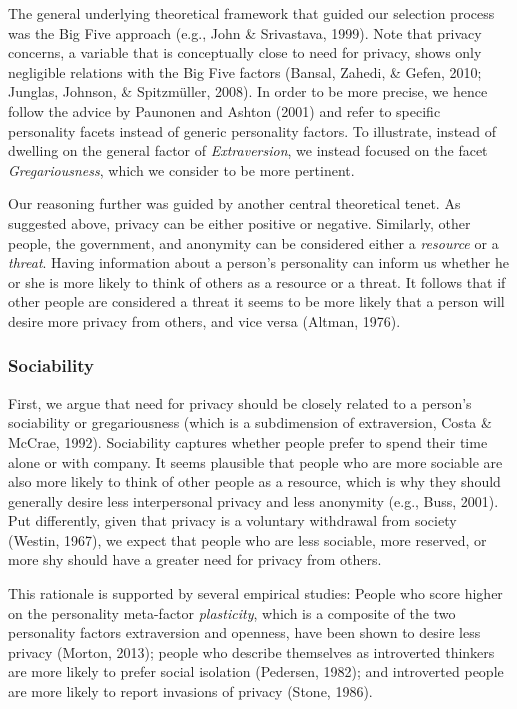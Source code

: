 \documentclass[man,floatsintext]{apa6}
\begin{document}
The general underlying theoretical framework that guided our selection process was the Big Five approach (e.g., John \& Srivastava, 1999). Note that privacy concerns, a variable that is conceptually close to need for privacy, shows only negligible relations with the Big Five factors (Bansal, Zahedi, \& Gefen, 2010; Junglas, Johnson, \& Spitzmüller, 2008). In order to be more precise, we hence follow the advice by Paunonen and Ashton (2001) and refer to specific personality facets instead of generic personality factors. To illustrate, instead of dwelling on the general factor of \emph{Extraversion}, we instead focused on the facet \emph{Gregariousness}, which we consider to be more pertinent.

Our reasoning further was guided by another central theoretical tenet. As suggested above, privacy can be either positive or negative. Similarly, other people, the government, and anonymity can be considered either a \emph{resource} or a \emph{threat}. Having information about a person's personality can inform us whether he or she is more likely to think of others as a resource or a threat. It follows that if other people are considered a threat it seems to be more likely that a person will desire more privacy from others, and vice versa (Altman, 1976).

\hypertarget{sociability}{%
\subsubsection{Sociability}\label{sociability}}

First, we argue that need for privacy should be closely related to a person's sociability or gregariousness (which is a subdimension of extraversion, Costa \& McCrae, 1992). Sociability captures whether people prefer to spend their time alone or with company. It seems plausible that people who are more sociable are also more likely to think of other people as a resource, which is why they should generally desire less interpersonal privacy and less anonymity (e.g., Buss, 2001). Put differently, given that privacy is a voluntary withdrawal from society (Westin, 1967), we expect that people who are less sociable, more reserved, or more shy should have a greater need for privacy from others.

This rationale is supported by several empirical studies: People who score higher on the personality meta-factor \emph{plasticity}, which is a composite of the two personality factors extraversion and openness, have been shown to desire less privacy (Morton, 2013); people who describe themselves as introverted thinkers are more likely to prefer social isolation (Pedersen, 1982); and introverted people are more likely to report invasions of privacy (Stone, 1986).
\end{document}
